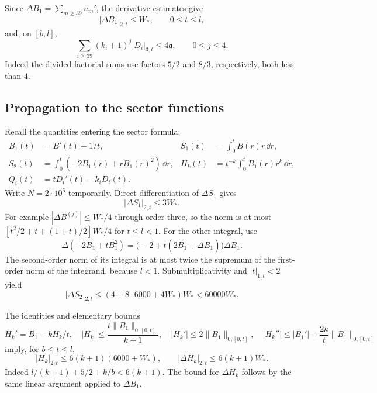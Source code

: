 Since $\Delta B_1=\sum_{m\geq39}u_m'$, the derivative estimates give
\[
 |\Delta B_1|_{2,t}\leq W_*,\qquad 0\leq t\leq l,
\]
and, on $[b,l]$,
\[
 \sum_{i\geq39}(k_i+1)^j|D_i|_{3,t}\leq4\mathfrak a,
 \qquad 0\leq j\leq4.
\]
Indeed the divided-factorial sums use factors $5/2$ and $8/3$,
respectively, both less than $4$.

\subsection{Propagation to the sector functions}
\label{tail:propagation}

Recall the quantities entering the sector formula:
\begin{align*}
 B_1(t)&=B'(t)+1/t,&
 S_1(t)&=\int_0^t B(r)r\,\dd r,\\
 S_2(t)&=\int_0^t(-2B_1(r)+rB_1(r)^2)\,\dd r,&
 H_k(t)&=t^{-k}\int_0^t B_1(r)r^k\,\dd r,\\
 Q_i(t)&=tD_i'(t)-k_iD_i(t).
\end{align*}
Write $N=2\cdot10^6$ temporarily.
Direct differentiation of $\Delta S_1$ gives
\[
 |\Delta S_1|_{2,t}\leq3W_*.
\]
For example $|\Delta B^{(j)}|\leq W_*/4$ through order three,
so the norm is at most
$[t^2/2+t+(1+t)/2]W_*/4$ for $t\leq l<1$.
For the other integral, use
\[
 \Delta(-2B_1+tB_1^2)
 =\bigl(-2+t(2\widetilde B_1+\Delta B_1)\bigr)\Delta B_1.
\]
The second-order norm of its integral is at most twice the supremum
of the first-order norm of the integrand, because $l<1$.
Submultiplicativity and $|t|_{1,t}<2$ yield
\[
 |\Delta S_2|_{2,t}
 \leq(4+8\cdot6000+4W_*)W_*<60000W_*.
\]

The identities and elementary bounds
\[
 H_k'=B_1-kH_k/t,\quad
 |H_k|\leq\frac{t\|B_1\|_{0,[0,t]}}{k+1},\quad
 |H_k'|\leq2\|B_1\|_{0,[0,t]},\quad
 |H_k''|\leq|B_1'|+\frac{2k}{t}\|B_1\|_{0,[0,t]}
\]
imply, for $b\leq t\leq l$,
\begin{equation}
 |H_k|_{2,t}\leq6(k+1)(6000+W_*),\qquad
 |\Delta H_k|_{2,t}\leq6(k+1)W_*.
 \label{tail:H-estimate}
\end{equation}
Indeed $l/(k+1)+5/2+k/b<6(k+1)$.  The bound for $\Delta H_k$
follows by the same linear argument applied to $\Delta B_1$.

